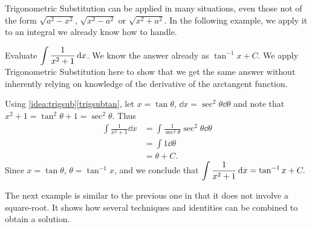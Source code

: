 Trigonometric Substitution can be applied in many situations, even those not of the form $\sqrt{a^2-x^2}$, $\sqrt{x^2-a^2}$ or $\sqrt{x^2+a^2}$. In the following example, we apply it to an integral we already know how to handle.

\begin{example}\label{ex_trigsub5}%
Evaluate $\displaystyle \int\frac1{x^2+1}\operatorname{d}\! x$.
\solution
We know the answer already as $\tan^{-1}x+C$. We apply Trigonometric Substitution here to show that we get the same answer without inherently relying on knowledge of the derivative of the arctangent function.

Using \autoref{idea:trigsub}\ref*{trigsubtan}, let $x=\tan\theta$, $\dd x=\sec^2\theta\dd\theta$ and note that $x^2+1 = \tan^2\theta+1 = \sec^2\theta$. Thus
\begin{align*}
\int \frac1{x^2+1}\dd x &= \int \frac{1}{\sec^2\theta}\sec^2\theta\dd\theta \\
			&= \int 1\dd\theta\\
			&= \theta + C.
\end{align*}
Since $x=\tan \theta$, $\theta = \tan^{-1}x$, and we conclude that $\displaystyle \int\frac1{x^2+1}\operatorname{d}\! x = \tan^{-1}x+C.$
\end{example}

The next example is similar to the previous one in that it does not involve a square-root. It shows how several techniques and identities can be combined to obtain a solution.

